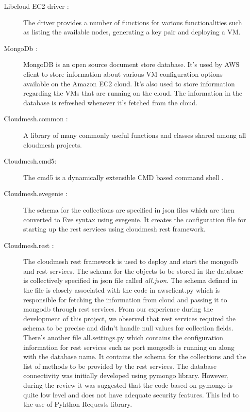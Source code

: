 \documentclass[9pt,twocolumn,twoside]{../../styles/osajnl}
\begin{document}
\begin{description}

\item [Libcloud EC2 driver \cite{www-libcloud-ec2}:] The driver
  provides a number of functions for various functionalities such as
  listing the available nodes, generating a key pair and deploying a
  VM.

\item [MongoDb \cite{www-mongodb}:] MongoDB is an open source document store
  database. It's used by AWS client to store information about various
  VM configuration options available on the Amazon EC2 cloud. It's
  also used to store information regarding the VMs that are running on
  the cloud. The information in the database is refreshed whenever
  it's fetched from the cloud.

\item [Cloudmesh.common \cite{www-cloudmesh-common}:] A library of
  many commonly useful functions and classes shared among all
  cloudmesh projects.

\item [Cloudmesh.cmd5:] The cmd5 is a dynamically extensible CMD based
  command shell \cite{www-cloudmesh-cmd5}.

\item [Cloudmesh.evegenie \cite{www-cloudmesh-evengine}:] The schema
  for the collections are specified in json files which are then
  converted to Eve syntax using evegenie. It creates the configuration
  file for starting up the rest services using cloudmesh rest
  framework.
	 	
\item [Cloudmesh.rest \cite{www-cloudmesh-rest}:] The cloudmesh rest
  framework is used to deploy and start the mongodb and rest
  services. The schema for the objects to be stored in the database is
  collectively specified in json file called {\it all.json}. The
  schema defined in the file is closely associated with the code in
  awsclient.py which is responsible for fetching the information from
  cloud and passing it to mongodb through rest services. From our
  experience during the development of this project, we observed that
  rest services required the schema to be precise and didn't handle
  null values for collection fields. There's another file
  all.settings.py which contains the configuration information for
  rest services such as port mongodb is running on along with the
  database name. It contains the schema for the collections and the
  list of methods to be provided by the rest services. The database
  connectivity was initially developed using pymongo library. However,
  during the review it was suggested that the code based on pymongo is
  quite low level and does not have adequate security features. This
  led to the use of Pyhthon Requests library.
	
\end{description}
\end{document}
